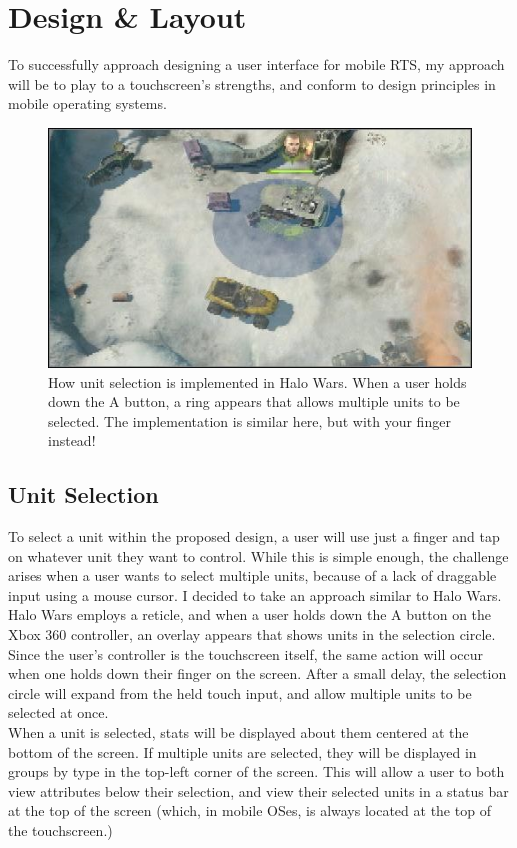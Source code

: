 \documentclass[11pt]{article}
\begin{document}
\section{Design \& Layout}
To successfully approach designing a user interface for mobile RTS, my approach will be to play to a touchscreen's strengths, and conform to design principles in mobile operating systems.
	\begin{figure}[!ht]
	\begin{center}
	\includegraphics[height = 2.5in]{blue-selection}
	\caption{How unit selection is implemented in Halo Wars. When a user holds down the A button, a ring appears that allows multiple units to be selected. The implementation is similar here, but with your finger instead!}
	\end{center}
	\end{figure}
	\subsection{Unit Selection}
	To select a unit within the proposed design, a user will use just a finger and tap on whatever unit they want to control. While this is simple enough, the challenge arises when a user wants to select multiple units, because of a lack of draggable input using a mouse cursor. I decided to take an approach similar to Halo Wars. Halo Wars employs a reticle, and when a user holds down the A button on the Xbox 360 controller, an overlay appears that shows units in the selection circle. Since the user's controller is the touchscreen itself, the same action will occur when one holds down their finger on the screen. After a small delay, the selection circle will expand from the held touch input, and allow multiple units to be selected at once. \\
	\indent When a unit is selected, stats will be displayed about them centered at the bottom of the screen. If multiple units are selected, they will be displayed in groups by type in the top-left corner of the screen. This will allow a user to both view attributes below their selection, and view their selected units in a status bar at the top of the screen (which, in mobile OSes, is always located at the top of the touchscreen.)
\end{document}
